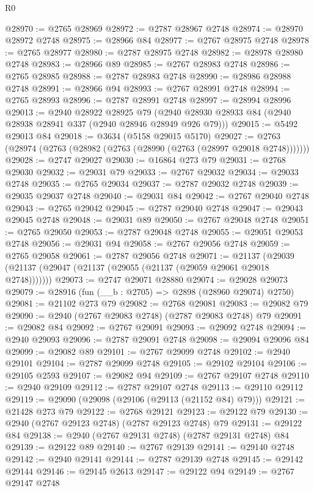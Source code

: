 \begin{lexlean}{R0}
\begin{coremodule}
@28970 := @2765 @28969
@28972 := @2787 @28967 @2748
@28974 := @28970 @28972 @2748
@28975 := @28966 @84
@28977 := @2767 @28975 @2748
@28978 := @2765 @28977
@28980 := @2787 @28975 @2748
@28982 := @28978 @28980 @2748
@28983 := @28966 @89
@28985 := @2767 @28983 @2748
@28986 := @2765 @28985
@28988 := @2787 @28983 @2748
@28990 := @28986 @28988 @2748
@28991 := @28966 @94
@28993 := @2767 @28991 @2748
@28994 := @2765 @28993
@28996 := @2787 @28991 @2748
@28997 := @28994 @28996
@29013 := @2940
    @28922
    @28925
    @79
    (@2940 @28930 @28933 @84 (@2940 @28938 @28941 @337 (@2940 @28946 @28949 @926 @79)))
@29015 := @5492 @29013 @84
@29018 := @3634 (@5158 @29015 @5170)
@29027 := @2763 (@28974 (@2763 (@28982 (@2763 (@28990 (@2763 (@28997 @29018 @2748)))))))
@29028 := @2747 @29027
@29030 := @16864 @273 @79
@29031 := @2768 @29030
@29032 := @29031 @79
@29033 := @2767 @29032
@29034 := @29033 @2748
@29035 := @2765 @29034
@29037 := @2787 @29032 @2748
@29039 := @29035 @29037 @2748
@29040 := @29031 @84
@29042 := @2767 @29040 @2748
@29043 := @2765 @29042
@29045 := @2787 @29040 @2748
@29047 := @29043 @29045 @2748
@29048 := @29031 @89
@29050 := @2767 @29048 @2748
@29051 := @2765 @29050
@29053 := @2787 @29048 @2748
@29055 := @29051 @29053 @2748
@29056 := @29031 @94
@29058 := @2767 @29056 @2748
@29059 := @2765 @29058
@29061 := @2787 @29056 @2748
@29071 := @21137 (@29039 (@21137 (@29047 (@21137 (@29055 (@21137 (@29059 @29061 @29018 @2748)))))))
@29073 := @2747 @29071 @28880
@29074 := @29028 @29073
@29079 := @28916 (fun (__b : @2705) => @2898 (@28960 @29074) @2750)
@29081 := @21102 @273 @79
@29082 := @2768 @29081
@29083 := @29082 @79
@29090 := @2940 (@2767 @29083 @2748) (@2787 @29083 @2748) @79
@29091 := @29082 @84
@29092 := @2767 @29091
@29093 := @29092 @2748
@29094 := @2940 @29093
@29096 := @2787 @29091 @2748
@29098 := @29094 @29096 @84
@29099 := @29082 @89
@29101 := @2767 @29099 @2748
@29102 := @2940 @29101
@29104 := @2787 @29099 @2748
@29105 := @29102 @29104
@29106 := @29105 @2593
@29107 := @29082 @94
@29109 := @2767 @29107 @2748
@29110 := @2940 @29109
@29112 := @2787 @29107 @2748
@29113 := @29110 @29112
@29119 := @29090 (@29098 (@29106 (@29113 (@21152 @84) @79)))
@29121 := @21428 @273 @79
@29122 := @2768 @29121
@29123 := @29122 @79
@29130 := @2940 (@2767 @29123 @2748) (@2787 @29123 @2748) @79
@29131 := @29122 @84
@29138 := @2940 (@2767 @29131 @2748) (@2787 @29131 @2748) @84
@29139 := @29122 @89
@29140 := @2767 @29139
@29141 := @29140 @2748
@29142 := @2940 @29141
@29144 := @2787 @29139 @2748
@29145 := @29142 @29144
@29146 := @29145 @2613
@29147 := @29122 @94
@29149 := @2767 @29147 @2748

\end{coremodule}
\end{lexlean}
